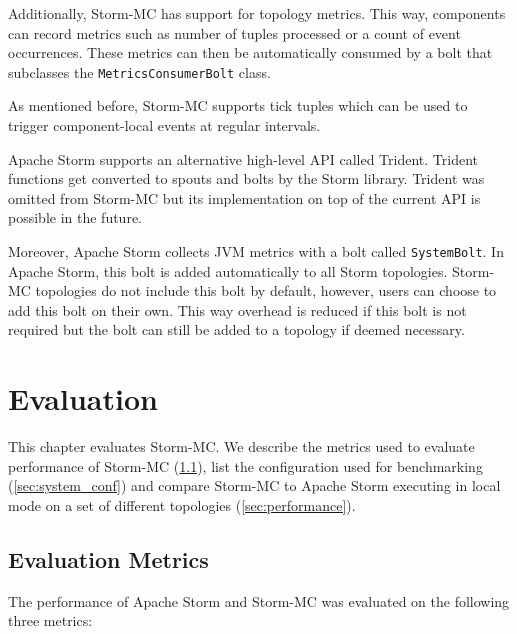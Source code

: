 \documentclass[bsc,deptreport,twoside,singlespacing,normalheadings,parskip]{infthesis}\usepackage[]{graphicx}\usepackage[]{color}
\begin{document}
Additionally, Storm-MC has support for topology metrics. This way, components can record metrics such as number of tuples processed or a count of event occurrences. These metrics can then be automatically consumed by a bolt that subclasses the \texttt{MetricsConsumerBolt} class.

As mentioned before, Storm-MC supports tick tuples which can be used  to trigger component-local events at regular intervals.

Apache Storm supports an alternative high-level API called Trident. Trident functions get converted to spouts and bolts by the Storm library. Trident was omitted from Storm-MC but its implementation on top of the current API is possible in the future.

Moreover, Apache Storm collects JVM metrics with a bolt called \texttt{SystemBolt}. In Apache Storm, this bolt is added automatically to all Storm topologies. Storm-MC topologies do not include this bolt by default, however, users can choose to add this bolt on their own. This way overhead is reduced if this bolt is not required but the bolt can still be added to a topology if deemed necessary.
\clearpage{}

\clearpage{}\clearpage{}

\clearpage{}\chapter{Evaluation}

This chapter evaluates Storm-MC. We describe the metrics used to evaluate performance of Storm-MC (\ref{sec:metrics}), list the configuration used for benchmarking (\ref{sec:system_conf}) and compare Storm-MC to Apache Storm executing in local mode on a set of different topologies (\ref{sec:performance}).

\section{Evaluation Metrics}
\label{sec:metrics}

The performance of Apache Storm and Storm-MC was evaluated on the following three metrics:
\end{document}
